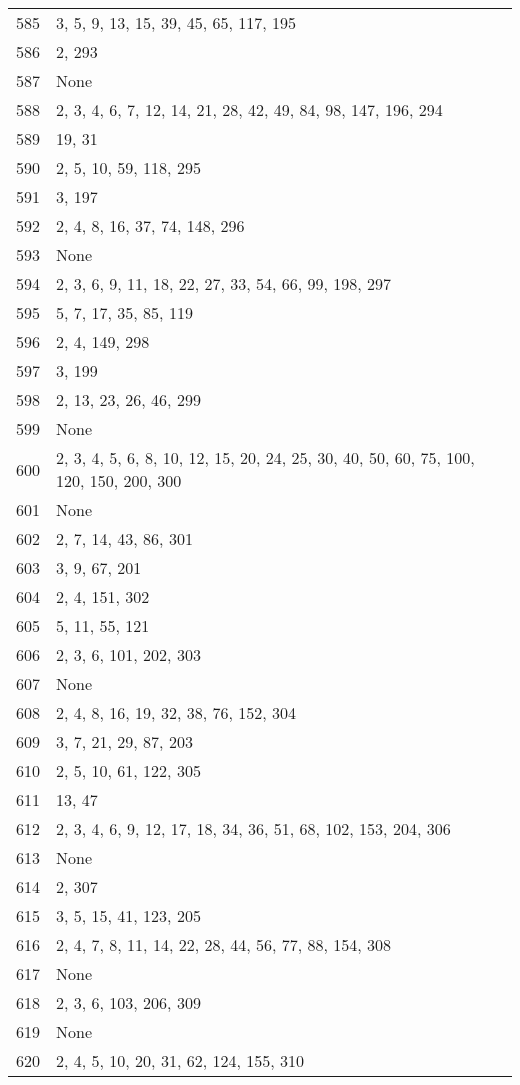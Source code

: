\documentclass[12pt]{article}
\begin{document}
\begin{tabular}{|r|l|}
585 & 3, 5, 9, 13, 15, 39, 45, 65, 117, 195 \\ 
586 & 2, 293 \\ 
587 & None \\ 
588 & 2,  3, 4, 6, 7, 12, 14, 21, 28, 42, 49, 84, 98, 147, 196, 294 \\ 
589 & 19, 31 \\ 
590 & 2, 5, 10, 59, 118, 295 \\ 
591 & 3, 197 \\ 
592 & 2, 4, 8, 16, 37, 74, 148, 296 \\ 
593 & None \\ 
594 & 2, 3, 6, 9, 11, 18, 22,  27, 33, 54, 66, 99, 198, 297 \\ 
595 & 5, 7, 17, 35, 85, 119 \\ 
596 & 2, 4, 149,  298 \\ 
597 & 3, 199 \\ 
598 & 2, 13, 23, 26, 46, 299 \\ 
599 & None \\ 
600 & 2, 3, 4, 5, 6, 8, 10, 12, 15, 20, 24, 25, 30, 40, 50, 60, 75, 100, 120, 150, 200, 300 \\ 
601 & None \\ 
602 & 2, 7, 14, 43, 86, 301 \\ 
603 & 3, 9, 67, 201 \\ 
604 & 2, 4, 151, 302 \\ 
605 & 5, 11, 55, 121 \\ 
606 & 2, 3,  6, 101, 202, 303 \\ 
607 & None \\ 
608 & 2, 4, 8, 16, 19, 32, 38, 76, 152, 304 \\ 
609 & 3, 7, 21, 29, 87, 203 \\ 
610 & 2, 5, 10, 61, 122, 305 \\ 
611 & 13, 47 \\ 
612 & 2, 3, 4, 6, 9, 12, 17, 18, 34, 36, 51, 68, 102, 153, 204, 306 \\ 
613 & None \\ 
614 & 2, 307 \\ 
615 & 3, 5, 15, 41, 123, 205 \\ 
616 & 2,  4, 7, 8, 11, 14, 22, 28, 44, 56, 77, 88, 154, 308 \\ 
617 & None \\ 
618 & 2, 3, 6, 103, 206, 309 \\ 
619 & None \\ 
620 & 2, 4, 5, 10, 20, 31, 62, 124, 155,  310 \\ 

\end{tabular}
\end{document}
